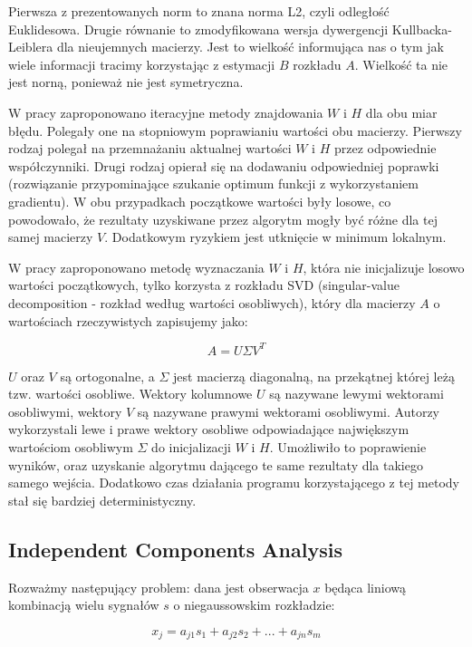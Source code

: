 \documentclass[oneside, eng]{mgr}
\begin{document}
Pierwsza z prezentowanych norm to znana norma L2, czyli odległość Euklidesowa. Drugie równanie to zmodyfikowana wersja dywergencji Kullbacka-Leiblera dla nieujemnych macierzy. Jest to wielkość informująca nas o tym jak wiele informacji tracimy korzystając z estymacji $B$ rozkładu $A$. Wielkość ta nie jest norną, ponieważ nie jest symetryczna.

W pracy \cite{NMF} zaproponowano iteracyjne metody znajdowania $W$ i $H$ dla obu miar błędu. Polegały one na stopniowym poprawianiu wartości obu macierzy. Pierwszy rodzaj polegał na przemnażaniu aktualnej wartości $W$ i $H$ przez odpowiednie współczynniki. Drugi rodzaj opierał się na dodawaniu odpowiedniej poprawki (rozwiązanie przypominające szukanie optimum funkcji z wykorzystaniem gradientu). W obu przypadkach początkowe wartości były losowe, co powodowało, że rezultaty uzyskiwane przez algorytm mogły być różne dla tej samej macierzy $V$. Dodatkowym ryzykiem jest utknięcie w minimum lokalnym.

W pracy \cite{NMF_SVD} zaproponowano metodę wyznaczania $W$ i $H$, która nie inicjalizuje losowo wartości początkowych, tylko korzysta z rozkładu SVD (singular-value decomposition - rozkład według wartości osobliwych), który dla macierzy $A$ o wartościach rzeczywistych zapisujemy jako:

\begin{equation}
	A = U \Sigma V^T
\end{equation}

$U$ oraz $V$ są ortogonalne, a $\Sigma$ jest macierzą diagonalną, na przekątnej której leżą tzw. wartości osobliwe. Wektory kolumnowe $U$ są nazywane lewymi wektorami osobliwymi, wektory $V$ są nazywane prawymi wektorami osobliwymi. Autorzy \cite{NMF_SVD} wykorzystali lewe i prawe wektory osobliwe odpowiadające największym wartościom osobliwym $\Sigma$ do inicjalizacji $W$ i $H$. Umożliwiło to poprawienie wyników, oraz uzyskanie algorytmu dającego te same rezultaty dla takiego samego wejścia. Dodatkowo czas działania programu korzystającego z tej metody stał się bardziej deterministyczny.

\subsection{Independent Components Analysis}

Rozważmy następujący problem: dana jest obserwacja $x$ będąca liniową kombinacją wielu sygnałów $s$ o niegaussowskim rozkładzie:

\begin{equation}
	x_j = a_{j1} s_1 + a_{j2} s_2 + ... + a_{jn} s_m
\end{equation}
\end{document}
